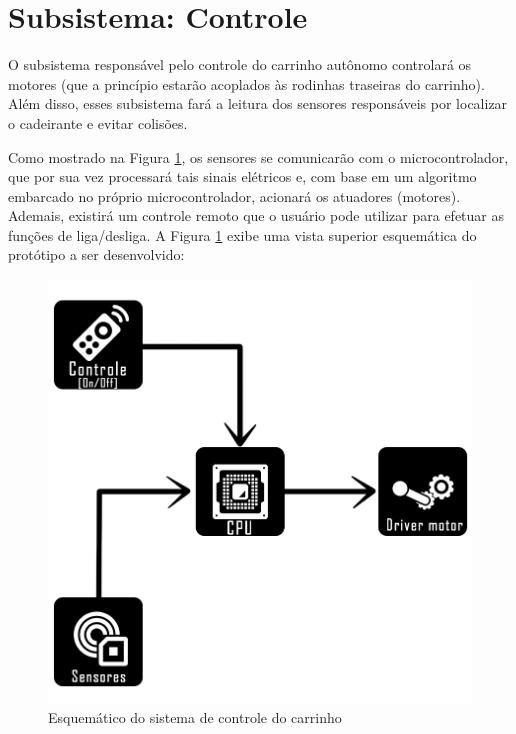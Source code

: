 \section{Subsistema: Controle} \label{sec:controle}

\par O subsistema responsável pelo controle do carrinho autônomo controlará os motores (que a princípio estarão acoplados às rodinhas traseiras do carrinho). Além disso, esses subsistema fará a leitura dos sensores responsáveis por localizar o cadeirante e evitar colisões. 

\par Como mostrado na Figura \ref{fig:esqCarrinho}, os sensores se comunicarão com o microcontrolador, que por sua vez processará tais sinais elétricos e, com base em um algoritmo embarcado no próprio microcontrolador, acionará os atuadores (motores). Ademais, existirá um controle remoto que o usuário pode utilizar para efetuar as funções de liga/desliga. A Figura \ref{fig:esqCarrinho} exibe uma vista superior esquemática do protótipo a ser desenvolvido:


\begin{figure}[hb]
		\centering
		\includegraphics[width=.5\textwidth]{figuras/diagrama.png}
		\caption{Esquemático do sistema de controle do carrinho}
		\label{fig:esqCarrinho}
\end{figure} 

